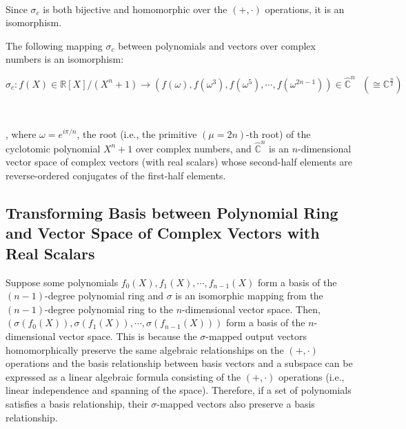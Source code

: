 $ $

Since $\sigma_c$ is both bijective and homomorphic over the $(+, \cdot)$ operations, it is an isomorphism. 


\begin{tcolorbox}[title={\textbf{\tboxtheorem{\ref*{subsec:poly-vector-transformation-complex}} Isomorphism between Polynomials and Vectors over Complex Numbers}}]

The following mapping $\sigma_c$ between polynomials and vectors over complex numbers is an isomorphism:

$\sigma_c: f(X) \in \mathbb{R}[X]/(X^n + 1) \longrightarrow (f(\omega),f(\omega^3),f(\omega^5), \cdots, f(\omega^{2n-1})) \in \hat{\mathbb{C}}^{n} \text{ } (\cong \mathbb{C}^{\frac{n}{2}})$

$ $

, where $\omega = e^{i\pi/n}$, the root (i.e., the primitive $(\mu=2n)$-th root) of the cyclotomic polynomial $X^n + 1$ over complex numbers, and $\hat{\mathbb{C}}^{n}$ is an $n$-dimensional vector space of complex vectors (with real scalars) whose second-half elements are reverse-ordered conjugates of the first-half elements. 

\end{tcolorbox}





\subsection{Transforming Basis between Polynomial Ring and Vector Space of Complex Vectors with Real Scalars}
\label{subsec:poly-vector-basis-transfer}


Suppose some polynomials $f_0(X), f_1(X), \cdots, f_{n-1}(X)$ form a basis of the $(n-1)$-degree polynomial ring and $\sigma$ is an isomorphic mapping from the $(n-1)$-degree polynomial ring to the $n$-dimensional vector space. Then, $(\sigma(f_0(X)), \sigma(f_1(X)), \cdots, \sigma(f_{n-1}(X)))$ form a basis of the $n$-dimensional vector space. This is because the $\sigma$-mapped output vectors homomorphically preserve the same algebraic relationships on the $(+, \cdot)$ operations and the basis relationship between basis vectors and a subspace can be expressed as a linear algebraic formula consisting of the $(+, \cdot)$ operations (i.e., linear independence and spanning of the space). Therefore, if a set of polynomials satisfies a basis relationship, their $\sigma$-mapped vectors also preserve a basis relationship.

